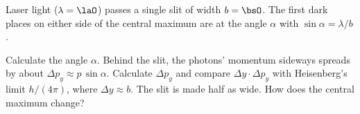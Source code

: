 Laser light ($\lambda = \laO$) passes a single slit of width $b = \bsO$. The first dark places on either side of the central maximum are at the angle $\alpha$ with $\sin\alpha = \lambda/b$.

\begin{abcliste}
\abc Calculate the angle $\alpha$.
\abc Behind the slit, the photons' momentum sideways spreads by about $\Delta p_y \approx p\,\sin\alpha$. Calculate $\Delta p_y$ and compare $\Delta y\cdot\Delta p_y$ with Heisenberg's limit $h/(4\pi)$, where $\Delta y \approx b$.
\abc The slit is made half as wide. How does the central maximum change?
\end{abcliste}
